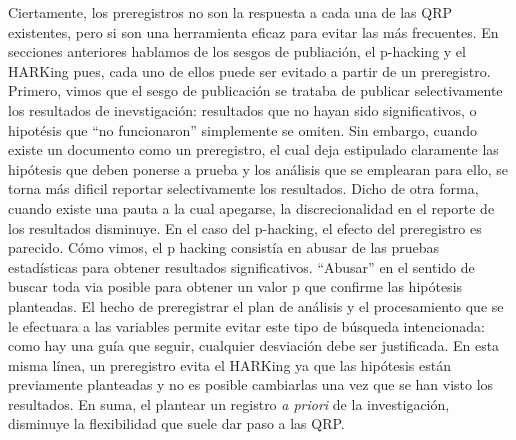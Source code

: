 \documentclass[
]{book}
\begin{document}
Ciertamente, los preregistros no son la respuesta a cada una de las QRP existentes, pero si son una herramienta eficaz para evitar las más frecuentes. En secciones anteriores hablamos de los sesgos de publiación, el p-hacking y el HARKing pues, cada uno de ellos puede ser evitado a partir de un preregistro. Primero, vimos que el sesgo de publicación se trataba de publicar selectivamente los resultados de inevstigación: resultados que no hayan sido significativos, o hipotésis que ``no funcionaron'' simplemente se omiten. Sin embargo, cuando existe un documento como un preregistro, el cual deja estipulado claramente las hipótesis que deben ponerse a prueba y los análisis que se emplearan para ello, se torna más dificil reportar selectivamente los resultados. Dicho de otra forma, cuando existe una pauta a la cual apegarse, la discrecionalidad en el reporte de los resultados disminuye. En el caso del p-hacking, el efecto del preregistro es parecido. Cómo vimos, el p hacking consistía en abusar de las pruebas estadísticas para obtener resultados significativos. ``Abusar'' en el sentido de buscar toda via posible para obtener un valor p que confirme las hipótesis planteadas. El hecho de preregistrar el plan de análisis y el procesamiento que se le efectuara a las variables permite evitar este tipo de búsqueda intencionada: como hay una guía que seguir, cualquier desviación debe ser justificada. En esta misma línea, un preregistro evita el HARKing ya que las hipótesis están previamente planteadas y no es posible cambiarlas una vez que se han visto los resultados. En suma, el plantear un registro \emph{a priori} de la investigación, disminuye la flexibilidad que suele dar paso a las QRP.
\end{document}
